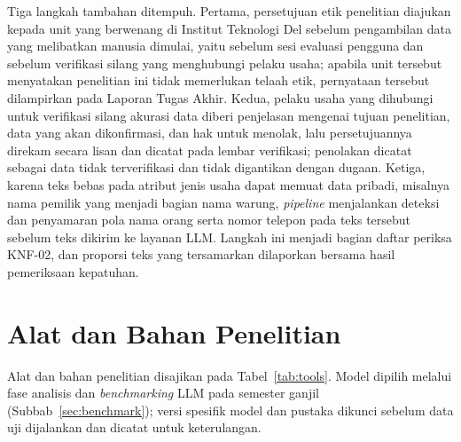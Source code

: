 Tiga langkah tambahan ditempuh. Pertama, persetujuan etik penelitian diajukan kepada unit yang berwenang di Institut Teknologi Del sebelum pengambilan data yang melibatkan manusia dimulai, yaitu sebelum sesi evaluasi pengguna dan sebelum verifikasi silang yang menghubungi pelaku usaha; apabila unit tersebut menyatakan penelitian ini tidak memerlukan telaah etik, pernyataan tersebut dilampirkan pada Laporan Tugas Akhir. Kedua, pelaku usaha yang dihubungi untuk verifikasi silang akurasi data diberi penjelasan mengenai tujuan penelitian, data yang akan dikonfirmasi, dan hak untuk menolak, lalu persetujuannya direkam secara lisan dan dicatat pada lembar verifikasi; penolakan dicatat sebagai data tidak terverifikasi dan tidak digantikan dengan dugaan. Ketiga, karena teks bebas pada atribut jenis usaha dapat memuat data pribadi, misalnya nama pemilik yang menjadi bagian nama warung, \textit{pipeline} menjalankan deteksi dan penyamaran pola nama orang serta nomor telepon pada teks tersebut sebelum teks dikirim ke layanan LLM. Langkah ini menjadi bagian daftar periksa KNF-02, dan proporsi teks yang tersamarkan dilaporkan bersama hasil pemeriksaan kepatuhan.

\section{Alat dan Bahan Penelitian}
\label{sec:alat}

Alat dan bahan penelitian disajikan pada Tabel~\ref{tab:tools}. Model dipilih melalui fase analisis dan \textit{benchmarking} LLM pada semester ganjil (Subbab~\ref{sec:benchmark}); versi spesifik model dan pustaka dikunci sebelum data uji dijalankan dan dicatat untuk keterulangan.


